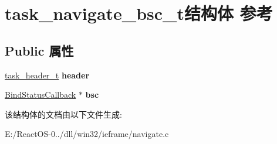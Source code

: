 \hypertarget{structtask__navigate__bsc__t}{}\section{task\+\_\+navigate\+\_\+bsc\+\_\+t结构体 参考}
\label{structtask__navigate__bsc__t}
\subsection*{Public 属性}
\begin{DoxyCompactItemize}
\item 
\mbox{\label{structtask__navigate__bsc__t_a823d1368e1bcfc82c536bcea13b8df9d}} 
\hyperlink{structtask__header__t}{task\+\_\+header\+\_\+t} {\bfseries header}
\item 
\mbox{\label{structtask__navigate__bsc__t_a0ce676d5909402dda273356d044fcf9a}} 
\hyperlink{struct_bind_status_callback}{Bind\+Status\+Callback} $\ast$ {\bfseries bsc}
\end{DoxyCompactItemize}


该结构体的文档由以下文件生成\+:\begin{DoxyCompactItemize}
\item 
E\+:/\+React\+O\+S-\/0../dll/win32/ieframe/navigate.\+c\end{DoxyCompactItemize}
